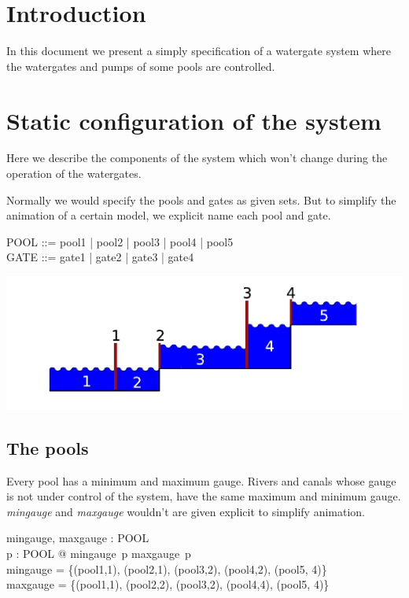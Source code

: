 \documentclass[a4paper]{article}
\begin{document}
\section{Introduction}
In this document we present a simply specification of a
watergate system where the watergates and pumps of some
pools are controlled.

\section{Static configuration of the system}
Here we describe the components of the system which won't change
during the operation of the watergates.

Normally we would specify the pools and gates as given sets. But
to simplify the animation of a certain model, we explicit name each pool
and gate.
\begin{zed}
  POOL ::= pool1 | pool2 | pool3 | pool4 | pool5\\
  GATE ::= gate1 | gate2 | gate3 | gate4
\end{zed}

\begin{center}
  \includegraphics{watergateillustration}
\end{center}

\subsection{The pools}
Every pool has a minimum and maximum gauge. Rivers and canals
whose gauge is not under control of the system, have the same
maximum and minimum gauge. \emph{mingauge} and \emph{maxgauge}
wouldn't are given explicit to simplify animation.

\begin{axdef}
  mingauge, maxgauge : POOL \fun \nat\\
  \where
  \forall p : POOL @ mingauge~p \leq maxgauge~p\\
  mingauge = \{(pool1,1), (pool2,1), (pool3,2), (pool4,2), (pool5, 4)\}\\
  maxgauge = \{(pool1,1), (pool2,2), (pool3,2), (pool4,4), (pool5, 4)\}\\
\end{axdef}
\end{document}
